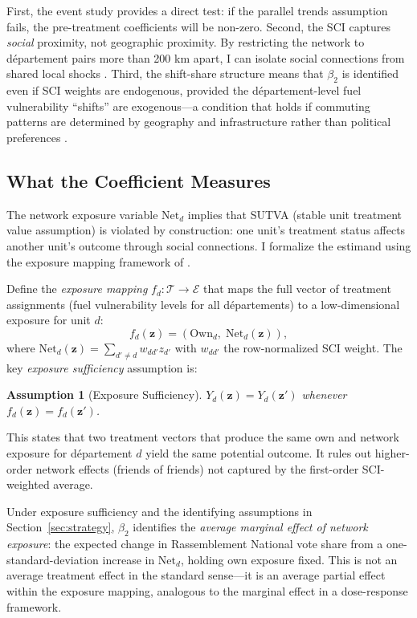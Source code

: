 \documentclass[12pt]{article}
\newtheorem{assumption}{Assumption}
\newcommand{\rn}{Rassemblement National}
\newcommand{\dept}{d\'{e}partement}
\newcommand{\depts}{d\'{e}partements}
\begin{document}
First, the event study provides a direct test: if the parallel trends assumption fails, the pre-treatment coefficients will be non-zero. Second, the SCI captures \emph{social} proximity, not geographic proximity. By restricting the network to \dept{} pairs more than 200 km apart, I can isolate social connections from shared local shocks \citep{bailey2020social}. Third, the shift-share structure means that $\beta_2$ is identified even if SCI weights are endogenous, provided the \dept{}-level fuel vulnerability ``shifts'' are exogenous---a condition that holds if commuting patterns are determined by geography and infrastructure rather than political preferences \citep{borusyak2022quasi}.

\subsection{What the Coefficient Measures}
\label{sec:estimand}

The network exposure variable $\text{Net}_d$ implies that SUTVA (stable unit treatment value assumption) is violated by construction: one unit's treatment status affects another unit's outcome through social connections. I formalize the estimand using the exposure mapping framework of \citet{aronow2017estimating}.

Define the \emph{exposure mapping} $f_d: \mathcal{T} \to \mathcal{E}$ that maps the full vector of treatment assignments (fuel vulnerability levels for all \depts{}) to a low-dimensional exposure for unit $d$:
\begin{equation}
f_d(\mathbf{z}) = \left(\text{Own}_d, \; \text{Net}_d(\mathbf{z})\right),
\label{eq:exposure_mapping}
\end{equation}
where $\text{Net}_d(\mathbf{z}) = \sum_{d' \neq d} w_{dd'} z_{d'}$ with $w_{dd'}$ the row-normalized SCI weight. The key \emph{exposure sufficiency} assumption is:
\begin{assumption}[Exposure Sufficiency]
$Y_d(\mathbf{z}) = Y_d(\mathbf{z}')$ whenever $f_d(\mathbf{z}) = f_d(\mathbf{z}')$.
\end{assumption}
This states that two treatment vectors that produce the same own and network exposure for \dept{} $d$ yield the same potential outcome. It rules out higher-order network effects (friends of friends) not captured by the first-order SCI-weighted average.

Under exposure sufficiency and the identifying assumptions in Section~\ref{sec:strategy}, $\beta_2$ identifies the \emph{average marginal effect of network exposure}: the expected change in \rn{} vote share from a one-standard-deviation increase in $\text{Net}_d$, holding own exposure fixed. This is not an average treatment effect in the standard sense---it is an average partial effect within the exposure mapping, analogous to the marginal effect in a dose-response framework.
\end{document}
